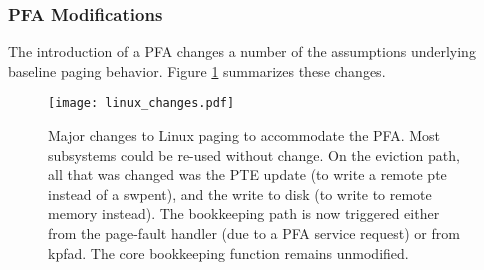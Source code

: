 
\subsubsection{PFA Modifications}
The introduction of a PFA changes a number of the assumptions underlying
baseline paging behavior. Figure \ref{fig:linux_changes} summarizes these
changes.

\begin{figure}[h] \centering
  \texttt{[image: linux\_changes.pdf]}
  \caption{Major changes to Linux paging to accommodate the PFA. Most
  subsystems could be re-used without change. On the eviction path, all that
  was changed was the PTE update (to write a remote \gls{pte} instead of a
  \gls{swpent}), and the write to disk (to write to remote memory instead). The
  bookkeeping path is now triggered either from the page-fault handler (due to
  a PFA service request) or from \gls{kpfad}. The core bookkeeping function
remains unmodified.}
  \label{fig:linux_changes}
\end{figure}

